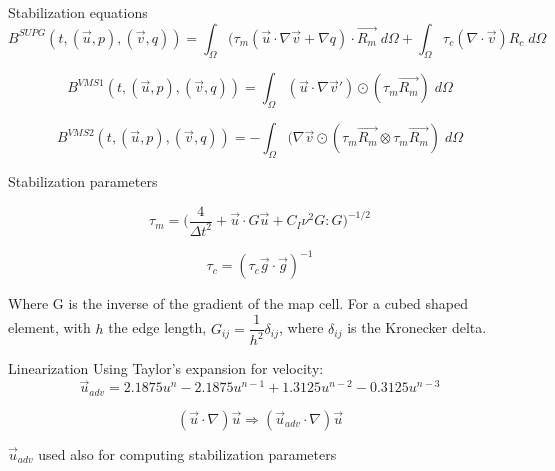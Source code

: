 \begin{frame}{Stabilization equations}
\begin{equation}
B^{SUPG}(t, (\Vec{u},p), (\Vec{v},q))  =     \int_\Omega(\tau_m(\Vec{u}\cdot\nabla \Vec{v} +\nabla q)\cdot\Vec{R_m} \;d\Omega+ \int_\Omega \tau_c (\nabla \cdot \Vec{v})R_c \;d\Omega
\label{equ:bsupg}
\end{equation}

\begin{equation}
B^{VMS1}(t, (\Vec{u},p), (\Vec{v},q))  = \int_\Omega (\Vec{u}\cdot\nabla \Vec{v}')\odot(\tau_m \Vec{R_m}) \;d\Omega
\label{equ:bvms1}
\end{equation}


\begin{equation}
B^{VMS2}(t, (\Vec{u},p), (\Vec{v},q))  = -\int_\Omega (\nabla\Vec{v}\odot(\tau_m \Vec{R_m} \otimes \tau_m \Vec{R_m}) \;d\Omega
\label{equ:bvms2}
\end{equation}

\end{frame}


\begin{frame}{Stabilization parameters}

\begin{equation}
\tau_m =\bigg( \dfrac{4}{\Delta t^2} + \Vec{u}\cdot{G}\Vec{u} + C_I \nu^2 {G}:{G} \bigg)^{-1/2}
\label{equ:taum}
\end{equation}

\begin{equation}
\tau_c = (\tau_c\Vec{g}\cdot\Vec{g})^{-1}
\label{equ:tauc}
\end{equation}

Where G is the inverse of the gradient of the map cell.
For a cubed shaped element, with $h$ the edge length, $G_{ij} =\dfrac{1}{h^2}\delta_{ij}$, where $\delta_{ij}$ is the Kronecker delta.

\end{frame}


\begin{frame}{Linearization}
Using Taylor's expansion for velocity:
\begin{equation}
    \Vec{u}_{adv} = 2.1875 u^{n} - 2.1875 u^{n-1} + 1.3125 u^{n-2} - 0.3125 u^{n-3} 
    \label{equlin:taylor_exp}
\end{equation}

\begin{equation}
 (\Vec{u}\cdot\nabla)\Vec{u} \Rightarrow  (\Vec{u}_{adv}\cdot\nabla)\Vec{u} 
\end{equation}

$\Vec{u}_{adv}$ used also for computing stabilization parameters


\end{frame}

